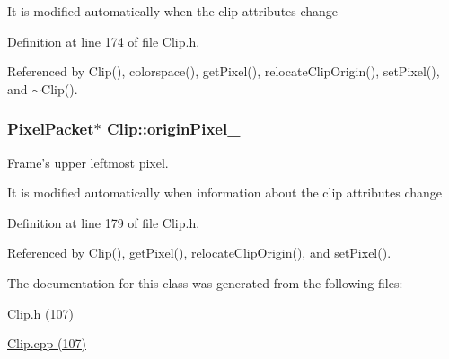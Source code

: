 It is modified automatically when the clip attributes change 

Definition at line 174 of file Clip.h.

Referenced by Clip(), colorspace(), getPixel(), relocateClipOrigin(), setPixel(), and $\sim$Clip().\hypertarget{class_clip_838228267146fd74e2828b7173b61091}{
\subsubsection[originPixel\_\-]{\setlength{\rightskip}{0pt plus 5cm}PixelPacket$\ast$ {\bf Clip::originPixel\_\-}}}
\label{class_clip_838228267146fd74e2828b7173b61091}


Frame's upper leftmost pixel. 

It is modified automatically when information about the clip attributes change 

Definition at line 179 of file Clip.h.

Referenced by Clip(), getPixel(), relocateClipOrigin(), and setPixel().

The documentation for this class was generated from the following files:\begin{CompactItemize}
\item 
\hyperlink{_clip_8h}{Clip.h (107)}\item 
\hyperlink{_clip_8cpp}{Clip.cpp (107)}\end{CompactItemize}
